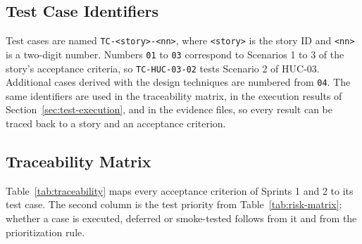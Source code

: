\subsection{Test Case Identifiers}
\label{sec:tc-ids}

Test cases are named \texttt{TC-<story>-<nn>}, where \texttt{<story>} is the story ID and
\texttt{<nn>} is a two-digit number. Numbers \texttt{01} to \texttt{03} correspond to Scenarios 1
to 3 of the story's acceptance criteria, so \texttt{TC-HUC-03-02} tests Scenario 2 of HUC-03.
Additional cases derived with the design techniques are numbered from \texttt{04}. The same
identifiers are used in the traceability matrix, in the execution results of
Section~\ref{sec:test-execution}, and in the evidence files, so every result can be traced back to
a story and an acceptance criterion.

\subsection{Traceability Matrix}

Table~\ref{tab:traceability} maps every acceptance criterion of Sprints 1 and 2 to its test case.
The second column is the test priority from Table~\ref{tab:risk-matrix}; whether a case is
executed, deferred or smoke-tested follows from it and from the prioritization rule.

